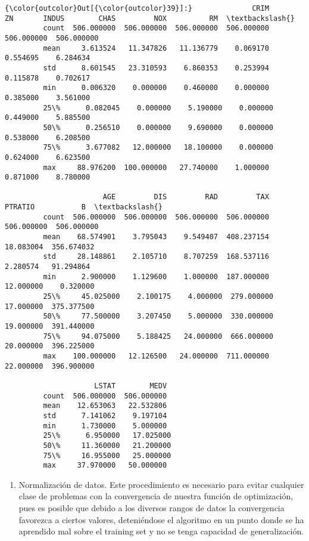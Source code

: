 \documentclass[10pt]{article}
\begin{document}
            \begin{Verbatim}[commandchars=\\\{\}]
{\color{outcolor}Out[{\color{outcolor}39}]:}              CRIM          ZN       INDUS        CHAS         NOX          RM  \textbackslash{}
         count  506.000000  506.000000  506.000000  506.000000  506.000000  506.000000   
         mean     3.613524   11.347826   11.136779    0.069170    0.554695    6.284634   
         std      8.601545   23.310593    6.860353    0.253994    0.115878    0.702617   
         min      0.006320    0.000000    0.460000    0.000000    0.385000    3.561000   
         25\%      0.082045    0.000000    5.190000    0.000000    0.449000    5.885500   
         50\%      0.256510    0.000000    9.690000    0.000000    0.538000    6.208500   
         75\%      3.677082   12.000000   18.100000    0.000000    0.624000    6.623500   
         max     88.976200  100.000000   27.740000    1.000000    0.871000    8.780000   
         
                       AGE         DIS         RAD         TAX     PTRATIO           B  \textbackslash{}
         count  506.000000  506.000000  506.000000  506.000000  506.000000  506.000000   
         mean    68.574901    3.795043    9.549407  408.237154   18.083004  356.674032   
         std     28.148861    2.105710    8.707259  168.537116    2.280574   91.294864   
         min      2.900000    1.129600    1.000000  187.000000   12.000000    0.320000   
         25\%     45.025000    2.100175    4.000000  279.000000   17.000000  375.377500   
         50\%     77.500000    3.207450    5.000000  330.000000   19.000000  391.440000   
         75\%     94.075000    5.188425   24.000000  666.000000   20.000000  396.225000   
         max    100.000000   12.126500   24.000000  711.000000   22.000000  396.900000   
         
                     LSTAT        MEDV  
         count  506.000000  506.000000  
         mean    12.653063   22.532806  
         std      7.141062    9.197104  
         min      1.730000    5.000000  
         25\%      6.950000   17.025000  
         50\%     11.360000   21.200000  
         75\%     16.955000   25.000000  
         max     37.970000   50.000000  
\end{Verbatim}
        
    \begin{enumerate}
\def\labelenumi{\alph{enumi})}
\setcounter{enumi}{2}
\itemsep1pt\parskip0pt
\item
  Normalización de datos. Este procedimiento es necesario para evitar
  cualquier clase de problemas con la convergencia de nuestra función de
  optimización, pues es posible que debido a los diversos rangos de
  datos la convergencia favorezca a ciertos valores, deteniéndose el
  algoritmo en un punto donde se ha aprendido mal sobre el training set
  y no se tenga capacidad de generalización.
\end{enumerate}
\end{document}
